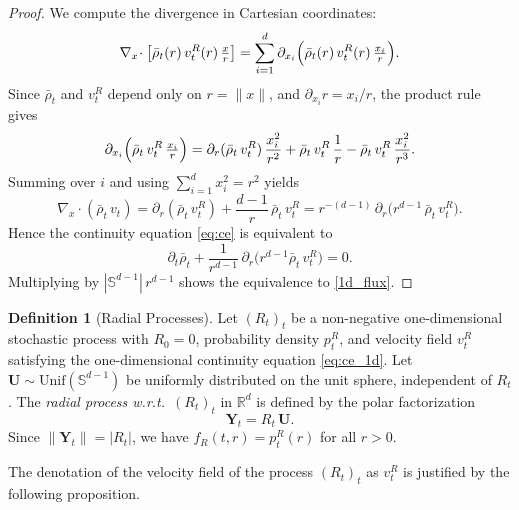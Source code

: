 \documentclass{article}
\theoremstyle{plain}
\theoremstyle{definition}
\newtheorem{definition}[theorem]{Definition}
\theoremstyle{remark}
\begin{document}
\begin{proof}
We compute the divergence in Cartesian coordinates:
\begin{equation}
\nabla_x \!\cdot \bigl[\bar\rho_t(r)\, v_t^R(r)\, \tfrac{x}{r} \bigr]
= \sum_{i=1}^d \partial_{x_i} \Bigl( \bar\rho_t(r)\, v_t^R(r)\, \tfrac{x_i}{r} \Bigr).
\end{equation}
Since $\bar\rho_t$ and $v_t^R$ depend only on $r = \|x\|$, and $\partial_{x_i} r = x_i/r$, the product rule gives
\begin{equation}
\partial_{x_i} \Bigl( \bar\rho_t\, v_t^R\, \tfrac{x_i}{r} \Bigr)
= \partial_r(\bar\rho_t\, v_t^R)\, \frac{x_i^2}{r^2} + \bar\rho_t\, v_t^R\, \frac{1}{r} - \bar\rho_t\, v_t^R\, \frac{x_i^2}{r^3}.
\end{equation}
Summing over $i$ and using $\sum_{i=1}^d x_i^2 = r^2$ yields
\begin{equation}
\nabla_x \!\cdot (\bar\rho_t\, v_t)
= \partial_r(\bar\rho_t\, v_t^R) + \frac{d-1}{r}\, \bar\rho_t\, v_t^R
= r^{-(d-1)}\, \partial_r \bigl( r^{d-1}\, \bar\rho_t\, v_t^R \bigr).
\end{equation}
Hence the continuity equation \eqref{eq:ce} is equivalent to
\begin{equation}
\partial_t \bar\rho_t + \frac{1}{r^{d-1}}\, \partial_r \bigl( r^{d-1} \bar\rho_t\, v_t^R \bigr) = 0.
\end{equation}
Multiplying by $|\mathbb{S}^{d-1}|\, r^{d-1}$ shows the equivalence to \eqref{1d_flux}.
\end{proof}

\begin{definition}[Radial Processes]\label{def:radial_process}
Let $(R_t)_t$ be a non-negative one-dimensional stochastic process with $R_0 = 0$, probability density $p_t^{R}$, and velocity field $v_t^{R}$ satisfying the one-dimensional continuity equation \eqref{eq:ce_1d}. Let $\mathbf{U} \sim \mathrm{Unif}(\mathbb{S}^{d-1})$ be uniformly distributed on the unit sphere, independent of $R_t$. The \emph{radial process w.r.t.}\ $(R_t)_t$ in $\mathbb{R}^d$ is defined by the polar factorization
\begin{equation}
\mathbf{Y}_t = R_t\, \mathbf{U}.
\end{equation}
Since $\|\mathbf{Y}_t\| = |R_t|$, we have $f_R(t,r) = p_t^{R}(r)$ for all $r > 0$.

\end{definition}
The denotation of the velocity field of the process $(R_t)_t$ as $v_t^{R}$ is justified by the following proposition.
\end{document}
